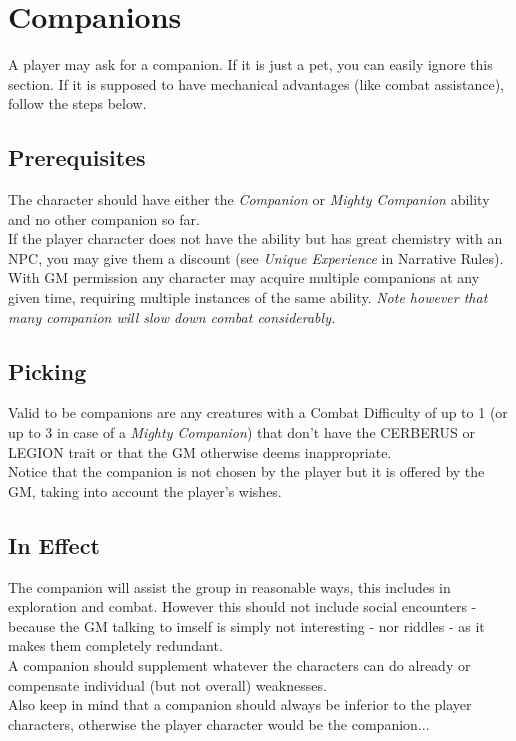 \documentclass[12pt,a4paper,openany]{book}
\begin{document}
	\section{Companions}
	A player may ask for a companion. If it is just a pet, you can easily ignore this section. If it is supposed to have mechanical advantages (like combat assistance), follow the steps below.
	\subsection{Prerequisites}
	The character should have either the \textit{Companion} or \textit{Mighty Companion} ability and no other companion so far.\\
	If the player character does not have the ability but has great chemistry with an NPC, you may give them a discount (see \textit{Unique Experience} in Narrative Rules).\\
	With GM permission any character may acquire multiple companions at any given time, requiring multiple instances of the same ability. \textit{Note however that many companion will slow down combat considerably.}
	\subsection{Picking}
	Valid to be companions are any creatures with a Combat Difficulty of up to 1 (or up to 3 in case of a \textit{Mighty Companion}) that don't have the CERBERUS or LEGION trait or that the GM otherwise deems inappropriate.\\
	Notice that the companion is not chosen by the player but it is offered by the GM, taking into account the player's wishes.
	\subsection{In Effect}
	The companion will assist the group in reasonable ways, this includes in exploration and combat. However this should not include social encounters - because the GM talking to imself is simply not interesting - nor riddles - as it makes them completely redundant.\\
	A companion should supplement whatever the characters can do already or compensate individual (but not overall) weaknesses.\\
	Also keep in mind that a companion should always be inferior to the player characters, otherwise the player character would be the companion...
\end{document}
